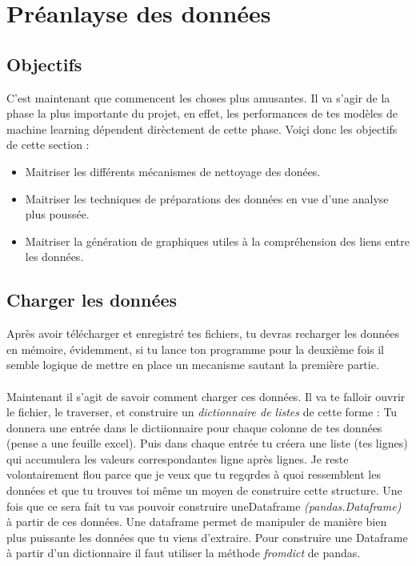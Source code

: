 \documentclass[10pt,a4paper]{book}
\begin{document}
\section{Préanlayse des données}

\subsection{Objectifs}

C'est maintenant que commencent les choses plus amusantes. Il va s'agir de la phase la plus importante du projet, en effet, les performances de tes modèles de machine learning dépendent dirèctement de cette phase. Voiçi donc les objectifs de cette section :
\begin{itemize}
\item Maitriser les différents mécanismes de nettoyage des donées.
\item Maitriser les techniques de préparations des données en vue d'une analyse plus poussée.
\item Maitriser la génération de graphiques utiles à la compréhension des liens entre les données.
\end{itemize}

\subsection{Charger les données}
Après avoir télécharger et enregistré tes fichiers, tu devras recharger les données en mémoire, évidemment, si tu lance ton programme pour la deuxième fois il semble logique de mettre en place un mecanisme sautant la première partie. 
\\\\
Maintenant il s'agit de savoir comment charger ces données. Il va te falloir ouvrir le fichier, le traverser, et construire un \textit{dictionnaire de listes} de cette forme :
Tu donnera une entrée dans le dictiionnaire pour chaque colonne de tes données (pense a une feuille excel). Puis dans chaque entrée tu créera une liste (tes lignes) qui accumulera les valeurs correspondantes ligne après lignes. Je reste volontairement flou parce que je veux que tu regqrdes à quoi ressemblent les données et que tu trouves toi même un moyen de construire cette structure. Une fois que ce sera fait tu vas pouvoir construire uneDataframe  \textit{(pandas.Dataframe)} à partir de ces données. Une dataframe permet de manipuler de manière bien plus puissante les données que tu viens d'extraire. Pour construire une Dataframe à partir d'un dictionnaire il faut utiliser la méthode \textit{fromdict} de pandas. 
\end{document}
